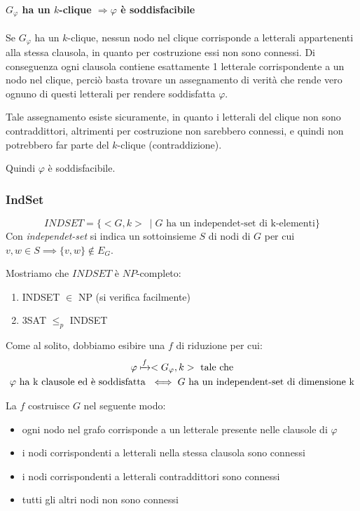\paragraph{$G_{\varphi}$ ha un $k$-clique $\Rightarrow \varphi$ è soddisfacibile}
Se $G_{\varphi}$ ha un $k$-clique, nessun nodo nel clique corrisponde a letterali appartenenti alla stessa clausola, in quanto per costruzione essi non sono connessi. Di conseguenza ogni clausola contiene esattamente 1 letterale corrispondente a un nodo nel clique, perciò basta trovare un assegnamento di verità che rende vero ognuno di questi letterali per rendere soddisfatta $\varphi$. 

Tale assegnamento esiste sicuramente, in quanto i letterali del clique non sono contraddittori, altrimenti per costruzione non sarebbero connessi, e quindi non potrebbero far parte del $k$-clique (contraddizione).

Quindi $\varphi$ è soddisfacibile.

\subsubsection{IndSet}
\[
	INDSET = \{ <G,k> \ \mid G\text{ ha un independet-set di k-elementi}\}
\]
Con \textit{independet-set} si indica un sottoinsieme $S$ di nodi di $G$ per cui $v, w \in S \implies \{v, w\} \notin E_G$. 

Mostriamo che $INDSET$ è $NP$-completo:
\begin{enumerate}
    \item INDSET $\in$ NP (si verifica facilmente)
    \item 3SAT $\leq_{p}$ INDSET
\end{enumerate}

Come al solito, dobbiamo esibire una $f$ di riduzione per cui:
\begin{gather*}
	\varphi \xmapsto{f} <G_{\varphi}, k> \text{ tale che} \\
	\varphi \text{ ha k clausole ed è soddisfatta } \iff G \text{ ha un independent-set di dimensione k}
\end{gather*}

La $f$ costruisce $G$ nel seguente modo:
\begin{itemize}
	\item ogni nodo nel grafo corrisponde a un letterale presente nelle clausole di $\varphi$

	\item i nodi corrispondenti a letterali nella stessa clausola sono connessi

	\item i nodi corrispondenti a letterali contraddittori sono connessi

	\item tutti gli altri nodi non sono connessi
\end{itemize}

